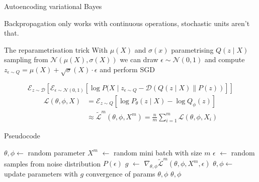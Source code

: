 \documentclass{beamer}
\begin{document}
\begin{frame}{Autoencoding variational Bayes}

    \alert{Backpropagation only works with continuous operations, stochastic units aren't that.}
    \begin{block}{The reparametrisation trick}
        With $\mu(X)$ and $\sigma(x)$ parametrising $Q(z \mid X)$ sampling from 
        $\mathcal{N}(\mu(X), \sigma(X))$ we can draw $\epsilon \sim \mathcal{N}(0, 1)$ and compute 
        $z_{\epsilon \sim Q} = \mu(X) + \sqrt{\sigma}(X) \cdot \epsilon$ and perform SGD

        \begin{equation}
            \mathcal{E}_{z\sim \mathcal{D}} \left[\mathcal{E}_{\epsilon \sim \mathcal{N}(0,1)} 
                \left[\log P(X\mid z_{\epsilon \sim Q} - \mathcal{D}
                \left( Q(z \mid X) \parallel P(z) \right)
\right] \right]
        \end{equation}
        \begin{equation}
            \begin{split}
                \mathcal{L} (\theta , \phi , X) &=
                \mathcal{E}_{z\sim Q} \left[\log P_\theta(z\mid X)-\log Q_\phi(z) \right]\\
                                                &\approx \tilde{\mathcal{L}}^m(\theta , \phi , X^m) 
                                                = \frac{n}{m} \sum_{i=1}^{m} \mathcal{L} (\theta , \phi , X_i)
            \end{split}
        \end{equation}

    \end{block}

\end{frame}


\begin{frame}{}
    \begin{block}{Pseudocode}
        \begin{algorithmic}
            \State $\theta, \phi \gets $ random parameter
            \Repeat
            \State $X^m$ $\gets$ random mini batch with size $m$
            \State $\epsilon$ $\gets$ random samples from noise distribution $P(\epsilon)$
            \State $g$ $\gets$ $\nabla _{\theta , \phi} \tilde{\mathcal{L}}^m(\theta , \phi , X^m , \epsilon) $
            \State $\theta, \phi \gets $ update parameters with $g$
            \Until convergence of params $\theta, \phi$
            \State \Return $\theta, \phi$
        \end{algorithmic}
    \end{block}
\end{frame}
\end{document}

